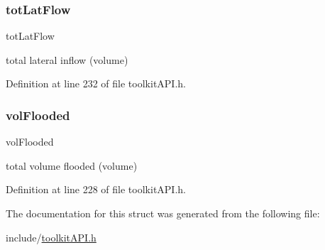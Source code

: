 \mbox{\label{struct_s_m___node_stats_add4807d2128a72b0de8c1fa096bde3aa}} 
\subsubsection{\texorpdfstring{tot\+Lat\+Flow}{totLatFlow}}
{\footnotesize\ttfamily tot\+Lat\+Flow}

total lateral inflow (volume) 

Definition at line 232 of file toolkit\+A\+P\+I.\+h.

\mbox{\label{struct_s_m___node_stats_adf413c73f0c6f3d2915edb21c3d358ab}} 
\subsubsection{\texorpdfstring{vol\+Flooded}{volFlooded}}
{\footnotesize\ttfamily vol\+Flooded}

total volume flooded (volume) 

Definition at line 228 of file toolkit\+A\+P\+I.\+h.



The documentation for this struct was generated from the following file\+:\begin{DoxyCompactItemize}
\item 
include/\hyperlink{toolkit_a_p_i_8h}{toolkit\+A\+P\+I.\+h}\end{DoxyCompactItemize}
